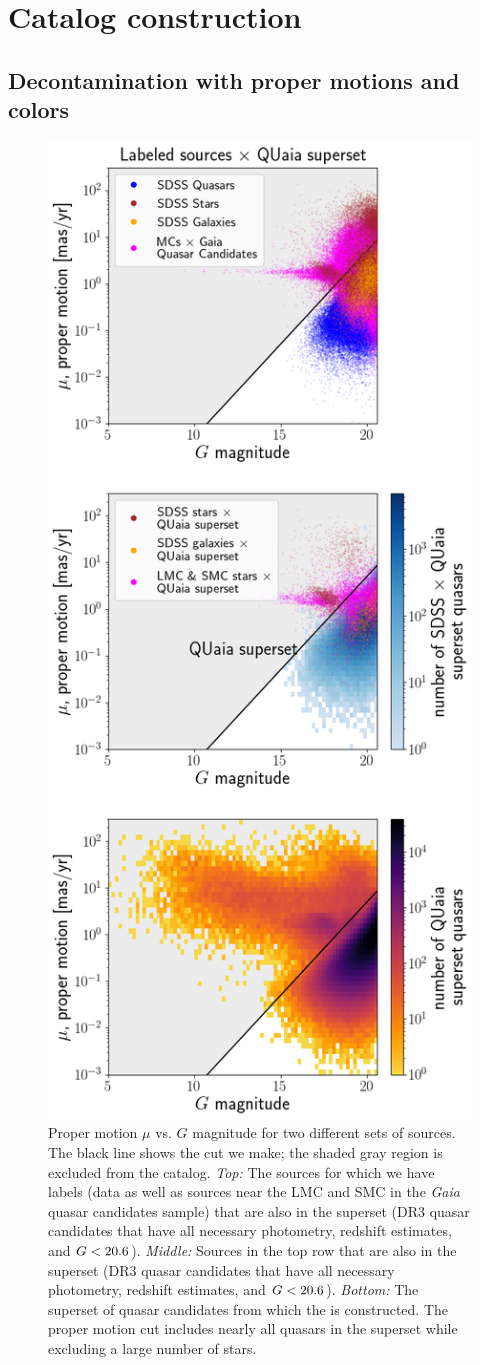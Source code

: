 \section{Catalog construction}
\label{sec:construction}

\subsection{Decontamination with proper motions and \unWISE colors}
\label{sec:decontam}

\begin{figure}
    \centering
    \includegraphics[width=0.42\columnwidth]{G_pm.png}

    \caption{Proper motion $\mu$ vs. $G$ magnitude  for two different sets of sources. The black line shows the cut we make; the shaded gray region is excluded from the catalog. \emph{Top:} The sources for which we have labels (\SDSS data as well as sources near the LMC and SMC in the \emph{Gaia} quasar candidates sample) that are also in the \cat superset (\Gaia DR3 quasar candidates that have all necessary photometry, \Gaia redshift estimates, and $G<20.6$). \emph{Middle:} Sources in the top row that are also in the \cat superset (\Gaia DR3 quasar candidates that have all necessary photometry, \Gaia redshift estimates, and $G<20.6$). \emph{Bottom:} The superset of quasar candidates from which the \catalog is constructed. The proper motion cut includes nearly all \SDSS quasars in the superset while excluding a large number of stars.} 
    \label{fig:G_pm}
\end{figure}

